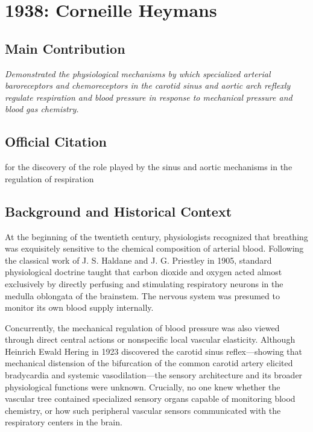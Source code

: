 \chapter[1938 --- Heymans]{1938: Corneille Heymans}
\label{ch:1938_corneilleheymans}

\section*{Main Contribution}

\textit{Demonstrated the physiological mechanisms by which specialized arterial baroreceptors and chemoreceptors in the carotid sinus and aortic arch reflexly regulate respiration and blood pressure in response to mechanical pressure and blood gas chemistry.}\cite{nobel-1938,lecture-1938,heymans-history,peripheral-chemoreceptors}

\section{Official Citation}

for the discovery of the role played by the sinus and aortic mechanisms in the regulation of respiration

\section{Background and Historical Context}

At the beginning of the twentieth century, physiologists recognized that breathing was exquisitely sensitive to the chemical composition of arterial blood. Following the classical work of J. S. Haldane and J. G. Priestley in 1905, standard physiological doctrine taught that carbon dioxide and oxygen acted almost exclusively by directly perfusing and stimulating respiratory neurons in the medulla oblongata of the brainstem. The nervous system was presumed to monitor its own blood supply internally.

Concurrently, the mechanical regulation of blood pressure was also viewed through direct central actions or nonspecific local vascular elasticity. Although Heinrich Ewald Hering in 1923 discovered the carotid sinus reflex—showing that mechanical distension of the bifurcation of the common carotid artery elicited bradycardia and systemic vasodilation—the sensory architecture and its broader physiological functions were unknown. Crucially, no one knew whether the vascular tree contained specialized sensory organs capable of monitoring blood chemistry, or how such peripheral vascular sensors communicated with the respiratory centers in the brain.

